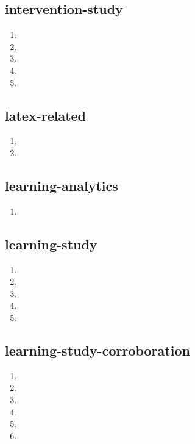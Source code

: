 \documentclass{article}
\begin{document}
\subsection{intervention-study}
\begin{enumerate}
\item {}
\item {}
\item {}
\item {}
\item {}
\end{enumerate}

\subsection{latex-related}
\begin{enumerate}
\item {}
\item {}
\end{enumerate}

\subsection{learning-analytics}
\begin{enumerate}
\item {}
\end{enumerate}

\subsection{learning-study}
\begin{enumerate}
\item {}
\item {}
\item {}
\item {}
\item {}
\end{enumerate}

\subsection{learning-study-corroboration}
\begin{enumerate}
\item {}
\item {}
\item {}
\item {}
\item {}
\item {}
\end{enumerate}
\end{document}
